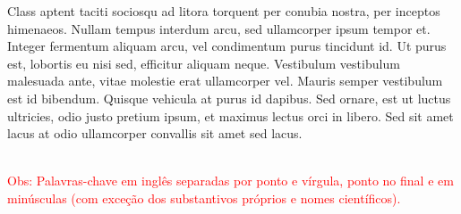 \begin{foreignabstract}

Class aptent taciti sociosqu ad litora torquent per conubia nostra, per inceptos himenaeos. Nullam tempus interdum arcu, sed ullamcorper ipsum tempor et. Integer fermentum aliquam arcu, vel condimentum purus tincidunt id. Ut purus est, lobortis eu nisi sed, efficitur aliquam neque. Vestibulum vestibulum malesuada ante, vitae molestie erat ullamcorper vel. Mauris semper vestibulum est id bibendum. Quisque vehicula at purus id dapibus. Sed ornare, est ut luctus ultricies, odio justo pretium ipsum, et maximus lectus orci in libero. Sed sit amet lacus at odio ullamcorper convallis sit amet sed lacus.

\\
\textcolor{red}{Obs: Palavras-chave em inglês separadas por ponto e vírgula, ponto no final e em minúsculas (com exceção dos substantivos próprios e nomes científicos).}

\end{foreignabstract}
